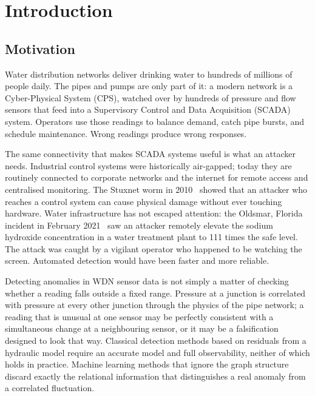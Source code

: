 \chapter{Introduction}
\label{ch:introduction}

\section{Motivation}
\label{sec:motivation}

Water distribution networks deliver drinking water to hundreds of
millions of people daily. The pipes and pumps are only part of it:
a modern network is a Cyber-Physical System (CPS), watched over by hundreds of
pressure and flow sensors that feed into a Supervisory Control and Data Acquisition (SCADA) system.
Operators use those readings to balance demand, catch pipe bursts,
and schedule maintenance. Wrong readings produce wrong responses.

The same connectivity that makes SCADA systems useful is
what an attacker needs. Industrial control systems were
historically air-gapped; today they are routinely connected to
corporate networks and the internet for remote access and centralised
monitoring. The Stuxnet worm in 2010~\cite{langner2011stuxnet} showed
that an attacker who reaches a control system can cause physical
damage without ever touching hardware. Water infrastructure has not
escaped attention: the Oldsmar, Florida incident in February
2021~\cite{oldsmar2021} saw an attacker remotely elevate the sodium
hydroxide concentration in a water treatment plant to 111 times the
safe level. The attack was caught by a vigilant operator who happened
to be watching the screen. Automated detection would have been faster
and more reliable.

Detecting anomalies in WDN sensor data is not simply a
matter of checking whether a reading falls outside a fixed range.
Pressure at a junction is correlated with pressure at every other
junction through the physics of the pipe network; a reading that is
unusual at one sensor may be perfectly consistent with a simultaneous
change at a neighbouring sensor, or it may be a falsification
designed to look that way. Classical detection methods based on
residuals from a hydraulic model require an accurate model and full
observability, neither of which holds in practice. Machine learning
methods that ignore the graph structure discard exactly the relational
information that distinguishes a real anomaly from a correlated
fluctuation.

